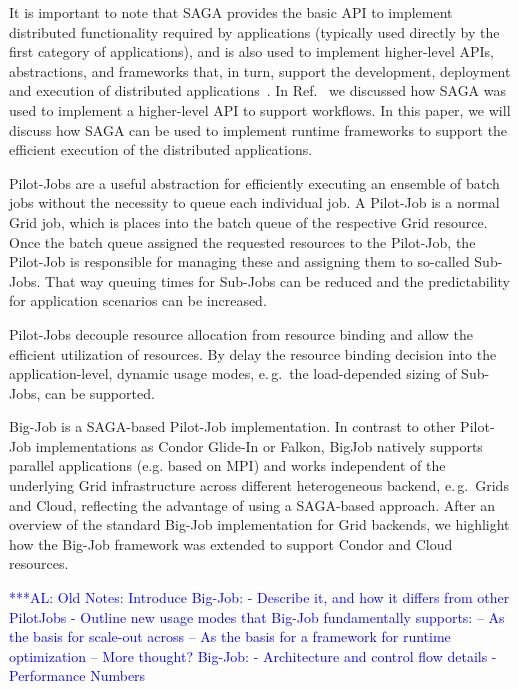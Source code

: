 \documentclass[conference,final]{IEEEtran}
\newcommand{\alnote}[1]{ {\textcolor{blue} { ***AL: #1 }}}
\newcommand{\alnote}[1]{}
\begin{document}
It is important to note that SAGA provides the basic API to
implement distributed functionality required by applications
(typically used directly by the first category of applications),
and is also used to implement higher-level APIs, abstractions, and
frameworks that, in turn, support the development, deployment and
execution of distributed
applications~\cite{gmac09,saga_data_intensive_abstractions}. In
Ref.~\cite{saga_montage} we discussed how SAGA was used to
implement a higher-level API to support workflows. In this paper, 
we will discuss how SAGA can be used to implement runtime
frameworks to support the efficient execution of the distributed
applications.



Pilot-Jobs are a useful abstraction for efficiently executing an ensemble
of batch jobs without the necessity to queue each individual job. A Pilot-Job
is a normal Grid job, which is places into the batch queue of the respective 
Grid resource. Once the batch queue assigned the requested resources to the Pilot-Job,
the Pilot-Job is responsible for managing these and assigning them to so-called Sub-Jobs. 
That way queuing times for Sub-Jobs can be reduced and the predictability for application
scenarios can be increased. 

Pilot-Jobs decouple resource allocation from resource binding and allow the efficient 
utilization of resources. By delay the resource binding decision into the application-level,
dynamic usage modes, e.\,g.\ the load-depended sizing of Sub-Jobs, can be supported.

Big-Job is a SAGA-based Pilot-Job implementation. In contrast to other Pilot-Job 
implementations as Condor Glide-In or Falkon, BigJob natively supports parallel 
applications (e.g. based on MPI) and works independent of the underlying Grid 
infrastructure across different heterogeneous backend, e.\,g.\ Grids and Cloud, 
reflecting the advantage of using a SAGA-based approach. After an overview of 
the standard Big-Job implementation for Grid backends, we highlight
how the Big-Job framework was extended to support Condor and Cloud resources.

\alnote{Old Notes: 
Introduce Big-Job:
 - Describe it, and how it differs from other PilotJobs
 - Outline new usage modes that Big-Job fundamentally supports:
    -- As the basis for scale-out across
    -- As the basis for a framework for runtime optimization
    -- More thought?
Big-Job:
 - Architecture and control flow details
 - Performance Numbers}
\end{document}
